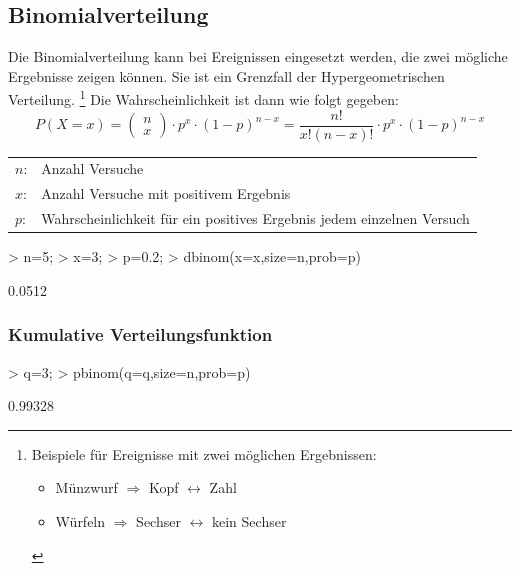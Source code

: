 \subsection{Binomialverteilung}
Die Binomialverteilung kann bei Ereignissen eingesetzt werden, die zwei 
mögliche Ergebnisse zeigen können. Sie ist ein Grenzfall der 
Hypergeometrischen Verteilung. 
\footnote{Beispiele für Ereignisse mit zwei möglichen Ergebnissen: 
  \begin{itemize} 
    \item Münzwurf $\Rightarrow$ Kopf $\leftrightarrow$ Zahl
    \item Würfeln $\Rightarrow$ Sechser $\leftrightarrow$ kein Sechser
  \end{itemize}}
Die Wahrscheinlichkeit ist dann wie folgt gegeben: 
\[ P(X=x) = 
\left( \begin{array}{c}n\\x\end{array} \right) \cdot p^x \cdot (1-p)^{n-x} 
= \frac{n!}{x! (n-x)!} \cdot p^x \cdot (1-p)^{n-x} \]
\begin{tabular}{@{}ll}
  $n$: & Anzahl Versuche \\
  $x$: & Anzahl Versuche mit positivem Ergebnis \\
  $p$: & Wahrscheinlichkeit für ein positives Ergebnis jedem einzelnen Versuch
\end{tabular} 
\begin{Schunk}
\begin{Sinput}
> n=5;
> x=3;
> p=0.2;
> dbinom(x=x,size=n,prob=p)
\end{Sinput}
\begin{Soutput}
[1] 0.0512
\end{Soutput}
\end{Schunk}
\subsubsection{Kumulative Verteilungsfunktion}
\begin{Schunk}
\begin{Sinput}
> q=3;
> pbinom(q=q,size=n,prob=p)
\end{Sinput}
\begin{Soutput}
[1] 0.99328
\end{Soutput}
\end{Schunk}

